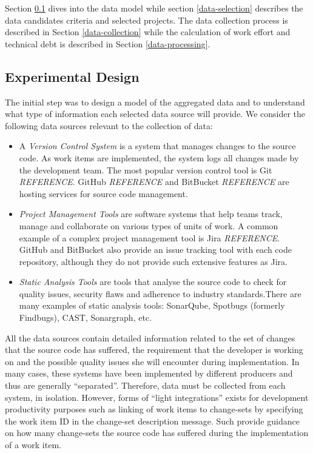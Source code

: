 \documentclass{mpaper}
\begin{document}
Section \ref{experimental-design} dives into the data model while section
\ref{data-selection} describes the data candidates criteria and selected
projects. The data collection process is described in Section
\ref{data-collection} while the calculation of work effort and technical debt is
described in Section \ref{data-processing}.

\subsection{Experimental Design}
\label{experimental-design}

The initial step was to design a model of the aggregated data and to understand
what type of information each selected data source will provide. We consider the
following data sources relevant to the collection of data:

\begin{itemize}
  \item A \emph{Version Control System} is a system that manages changes to the
  source code. As work items are implemented, the system logs all changes made
  by the development team. The most popular version control tool is Git
  \emph{REFERENCE}. GitHub \emph{REFERENCE} and BitBucket \emph{REFERENCE} are
  hosting services for source code management.

  \item \emph{Project Management Tools} are software systems that help teams
  track, manage and collaborate on various types of units of work. A common
  example of a complex project management tool is Jira \emph{REFERENCE}. GitHub
  and BitBucket also provide an issue tracking tool with each code repository,
  although they do not provide such extensive features as Jira.
  
  \item \emph{Static Analysis Tools} are tools that analyse the source code to
  check for quality issues, security flaws and adherence to industry
  standards.There are many examples of static analysis tools: SonarQube,
  Spotbugs (formerly Findbugs), CAST, Sonargraph, etc.

\end{itemize}

All the data sources contain detailed information related to the set of changes
that the source code has suffered, the requirement that the developer is working
on and the possible quality issues she will encounter during implementation. In
many cases, these systems have been implemented by different producers and thus
are generally ``separated''. Therefore, data must be collected from each system,
in isolation. However, forms of ``light integrations'' exists for development
productivity purposes such as linking of work items to change-sets by specifying
the work item ID in the change-set description message. Such provide guidance on
how many change-sets the source code has suffered during the implementation of a
work item.
\end{document}
